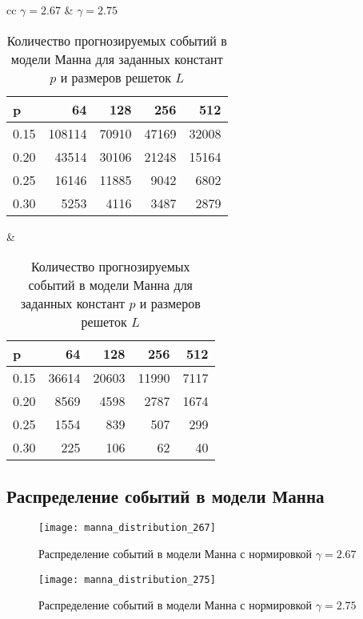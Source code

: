 \begin{table}[h]
	\caption{Количество прогнозируемых событий в модели Манна для заданных констант $p$ и размеров решеток $L$}
	\begin{tabular}{cc}
		$\gamma = 2.67$ & $\gamma = 2.75$ \\
		\begin{tabular}{l|rrrr}
			\toprule
			p &     64  &    128 &    256 &    512 \\
			\midrule
			0.15 &  108114 &  70910 &  47169 &  32008 \\
			0.20 &   43514 &  30106 &  21248 &  15164 \\
			0.25 &   16146 &  11885 &   9042 &   6802 \\
			0.30 &    5253 &   4116 &   3487 &   2879 \\
			\bottomrule
		\end{tabular}
		&
		\begin{tabular}{lrrrr}
			\toprule
			p &    64  &    128 &    256 &   512 \\
			\midrule
			0.15 &  36614 &  20603 &  11990 &  7117 \\
			0.20 &   8569 &   4598 &   2787 &  1674 \\
			0.25 &   1554 &    839 &    507 &   299 \\
			0.30 &    225 &    106 &     62 &    40 \\
			\bottomrule
		\end{tabular}
	\end{tabular}
\end{table}

\newpage
\clearpage

\subsection{Распределение событий в модели Манна}\label{appendix:d}

\begin{figure}[h]
	\centering
	\texttt{[image: manna\_distribution\_267]}
	\caption{Распределение событий в модели Манна с нормировкой $\gamma=2.67$}
\end{figure}

\begin{figure}[h]
	\centering
	\texttt{[image: manna\_distribution\_275]}
	\caption{Распределение событий в модели Манна с нормировкой $\gamma=2.75$}
\end{figure}